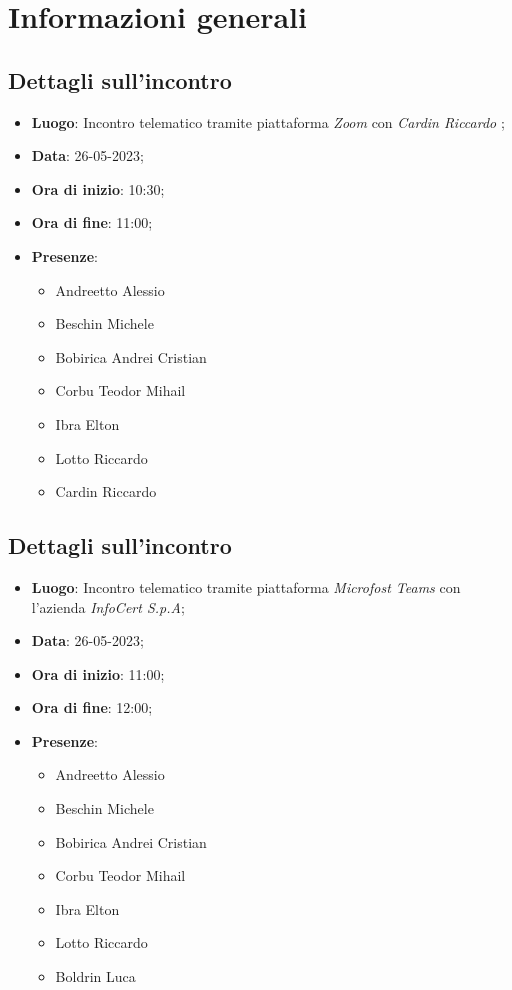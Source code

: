 \section{Informazioni generali}

\subsection{Dettagli sull'incontro}
\begin{itemize}
\item \textbf{Luogo}: Incontro telematico tramite piattaforma \textit{Zoom\glo} con \textit{Cardin Riccardo} ;
\item \textbf{Data}: 26-05-2023;
\item \textbf{Ora di inizio}: 10:30;
\item \textbf{Ora di fine}: 11:00;
\item \textbf{Presenze}: 
\begin{itemize}
	\item Andreetto Alessio
    \item Beschin Michele
    \item Bobirica Andrei Cristian
    \item Corbu Teodor Mihail
    \item Ibra Elton
    \item Lotto Riccardo 
    \item Cardin Riccardo
\end{itemize}
\end{itemize}


\subsection{Dettagli sull'incontro}
\begin{itemize}
\item \textbf{Luogo}: Incontro telematico tramite piattaforma \textit{Microfost Teams\glo} con l'azienda \textit{InfoCert S.p.A};
\item \textbf{Data}: 26-05-2023;
\item \textbf{Ora di inizio}: 11:00;
\item \textbf{Ora di fine}: 12:00;
\item \textbf{Presenze}: 
\begin{itemize}
	\item Andreetto Alessio
    \item Beschin Michele
    \item Bobirica Andrei Cristian
    \item Corbu Teodor Mihail
    \item Ibra Elton
    \item Lotto Riccardo 
    \item Boldrin Luca 
\end{itemize}
\end{itemize}




